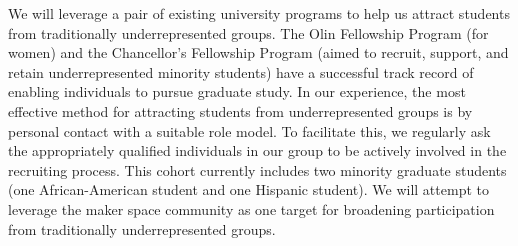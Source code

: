 We will leverage a pair of existing university programs to help us
attract students from traditionally underrepresented groups.  The Olin
Fellowship Program (for women) and the Chancellor's Fellowship Program
(aimed to recruit, support, and retain underrepresented minority 
students) have a successful track
record of enabling individuals to pursue graduate study.  In our
experience, the most effective method for attracting students from
underrepresented groups is by personal contact with a suitable role
model.  To facilitate this, we regularly ask the appropriately
qualified individuals in our group to be actively involved in the
recruiting process.  This cohort currently includes two
minority graduate students (one African-American student and one Hispanic 
student).
We will attempt to leverage the maker space community as one target
for broadening participation from traditionally underrepresented groups.
